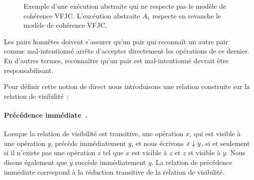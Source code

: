 \begin{figure}[htb]
\centering
{}
\caption{Exemple d'une exécution abstraite qui ne respecte pas le modèle de cohérence \ac{VFJC}.
L'excéution abstraite $A_1$ respecte en revanche le modèle de cohérence \ac{VFJC}.}\label{fig:known-colluding-malicious}
\end{figure}

Les pairs honnêtes doivent s'assurer qu'un pair qui reconnaît un autre pair comme mal-intentionné arrête d'accepter directement les opérations de ce dernier.
En d'autres termes, reconnaître qu'un pair est mal-intentionné devrait être responsabilisant.

Pour définir cette notion de direct nous introduisons une relation construite sur la relation de visibilité~:

\paragraph{Précédence immédiate~\autocite{hernandez2003immediate,hernandez2015minimal}.}
Lorsque la relation de visibilité est transitive, une opération $x$, qui est visible à une opération $y$, précède immédiatement $y$, et nous écrivons $x \downarrow y$, si et seulement si il n'existe pas une opération $z$ tel que $x$ est visible à $z$ et $z$ st visible à $y$.
Nous disons également que $y$ succède immédiatement $y$.
La relation de précédence immédiate correspond à la réduction transitive de la relation de visibilité.

